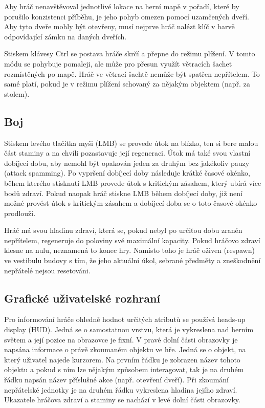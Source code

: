 \documentclass[FM,Proj]{tulthesis}
\begin{document}
	Aby hráč nenavštěvoval jednotlivé lokace na herní mapě v pořadí, které by porušilo konzistenci příběhu, je jeho pohyb omezen pomocí uzamčených dveří. Aby tyto dveře mohly být otevřeny, musí nejprve hráč nalézt klíč v barvě odpovídající zámku na daných dveřích.
	
	Stiskem klávesy Ctrl se postava hráče skrčí a přepne do režimu plížení. V tomto módu se pohybuje pomaleji, ale může pro přesun využít větracích šachet rozmístěných po mapě. Hráč ve větrací šachtě nemůže být spatřen nepřítelem. To samé platí, pokud je v režimu plížení schovaný za nějakým objektem (např. za stolem).
	
	\subsection{Boj} %
	
	Stiskem levého tlačítka myši (LMB) se provede útok na blízko, ten si bere malou část staminy a na chvíli pozastavuje její regeneraci. Útok má také svou vlastní dobíjecí dobu, aby nemohl být opakován jeden za druhým bez jakékoliv pauzy (attack spamming). Po vypršení dobíjecí doby následuje krátké časové okénko, během kterého stisknutí LMB provede útok s kritickým zásahem, který ubírá více bodů zdraví. Pokud naopak hráč stiskne LMB během dobíjecí doby, již není možné provést útok s kritickým zásahem a dobíjecí doba se o toto časové okénko prodlouží.
	
	Hráč má svou hladinu zdraví, která se, pokud nebyl po určitou dobu zraněn nepřítelem, regeneruje do poloviny své maximální kapacity. Pokud hráčovo zdraví klesne na nulu, neznamená to konec hry. Namísto toho je hráč oživen (respawn) ve vestibulu budovy s tím, že jeho aktuální úkol, sebrané předměty a zneškodnění nepřátelé nejsou resetováni.
		
	\subsection{Grafické uživatelské rozhraní} %
	
	Pro informování hráče ohledně hodnot určitých atributů se používá heads-up display (HUD). Jedná se o samostatnou vrstvu, která je vykreslena nad herním světem a její pozice na obrazovce je fixní. V pravé dolní části obrazovky je napsána informace o právě zkoumaném objektu ve hře. Jedná se o objekt, na který uživatel najede kurzorem. Na prvním řádku je zobrazen název tohoto objektu a pokud s ním lze nějakým způsobem interagovat, tak je na druhém řádku napsán název příslušné akce (např. otevření dveří). Při zkoumání nepřátelské jednotky je na druhém řádku vykreslena hladina jejího zdraví. Ukazatele hráčova zdraví a staminy se nachází v levé dolní části obrazovky.
	
\end{document}
